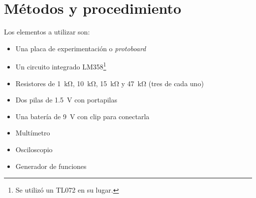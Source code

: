 \section{Métodos y procedimiento}

Los elementos a utilizar son:

\begin{itemize}
    \item Una placa de experimentación o \textit{protoboard}
    \item Un circuito integrado LM358\footnote{Se utilizó un TL072 en su lugar.}
    \item Resistores de \SI{1}{\kilo\ohm}, \SI{10}{\kilo\ohm}, \SI{15}{\kilo\ohm} y \SI{47}{\kilo\ohm} (tres de cada uno)
    \item Dos pilas de \SI{1.5}{\volt} con portapilas
    \item Una batería de \SI{9}{\volt} con clip para conectarla
    \item Multímetro
    \item Osciloscopio
    \item Generador de funciones
\end{itemize}

